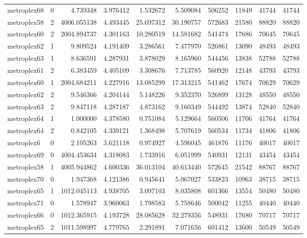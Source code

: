 \begin{longtable}{|l|r|r|r|r|r|r|r|r|r|}
metroplex68 & 0 & 4.739348 & 3.976412 & 1.532672 & 5.509084 & 506252 & 11849 & 41744 & 41744 \\
metroplex58 & 2 & 4006.055138 & 4.493445 & 25.697312 & 30.190757 & 572683 & 21580 & 88820 & 88820 \\
metroplex60 & 2 & 2004.894737 & 4.301163 & 10.280519 & 14.581682 & 541474 & 17686 & 70645 & 70645 \\
metroplex62 & 1 & 9.809524 & 4.191409 & 3.286561 & 7.477970 & 526861 & 13090 & 48493 & 48493 \\
metroplex63 & 1 & 8.636591 & 4.287931 & 3.878029 & 8.165960 & 544456 & 13838 & 52788 & 52788 \\
metroplex61 & 2 & 6.383459 & 4.405109 & 3.308676 & 7.713785 & 560920 & 12148 & 43793 & 43793 \\
metroplex60 & 1 & 2004.684211 & 4.227916 & 13.085299 & 17.313215 & 541462 & 17674 & 70629 & 70629 \\
metroplex62 & 2 & 9.546366 & 4.204144 & 5.148226 & 9.352370 & 526899 & 13128 & 48550 & 48550 \\
metroplex63 & 2 & 9.847118 & 4.287187 & 4.873162 & 9.160349 & 544492 & 13874 & 52840 & 52840 \\
metroplex64 & 1 & 1.000000 & 4.378580 & 0.751084 & 5.129664 & 560506 & 11706 & 41764 & 41764 \\
metroplex64 & 2 & 0.842105 & 4.339121 & 1.368498 & 5.707619 & 560534 & 11734 & 41806 & 41806 \\
metroplex6 & 0 & 2.105263 & 3.621118 & 0.974927 & 4.596045 & 461876 & 11176 & 40017 & 40017 \\
metroplex69 & 0 & 4004.453634 & 4.318083 & 1.733916 & 6.051999 & 540931 & 12131 & 43454 & 43454 \\
metroplex58 & 1 & 4005.944862 & 4.600336 & 36.013104 & 40.613440 & 572645 & 21542 & 88767 & 88767 \\
metroplex70 & 0 & 1.947368 & 4.121386 & 0.945641 & 5.067027 & 533823 & 10963 & 38715 & 38715 \\
metroplex65 & 1 & 1012.045113 & 4.938705 & 3.097103 & 8.035808 & 601366 & 13554 & 50480 & 50480 \\
metroplex71 & 0 & 1.578947 & 3.960063 & 1.798583 & 5.758646 & 500042 & 11255 & 40440 & 40440 \\
metroplex66 & 0 & 1012.365915 & 4.193728 & 28.085628 & 32.279356 & 548931 & 17680 & 70717 & 70717 \\
metroplex65 & 2 & 1011.598997 & 4.779765 & 2.291891 & 7.071656 & 601412 & 13600 & 50549 & 50549 \\

\end{longtable}
